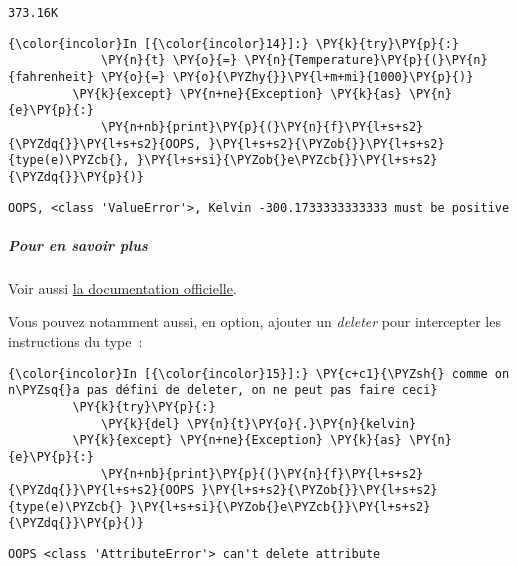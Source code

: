     \begin{Verbatim}[commandchars=\\\{\}]
373.16K

    \end{Verbatim}

    \begin{Verbatim}[commandchars=\\\{\}]
{\color{incolor}In [{\color{incolor}14}]:} \PY{k}{try}\PY{p}{:}
             \PY{n}{t} \PY{o}{=} \PY{n}{Temperature}\PY{p}{(}\PY{n}{fahrenheit} \PY{o}{=} \PY{o}{\PYZhy{}}\PY{l+m+mi}{1000}\PY{p}{)}
         \PY{k}{except} \PY{n+ne}{Exception} \PY{k}{as} \PY{n}{e}\PY{p}{:}
             \PY{n+nb}{print}\PY{p}{(}\PY{n}{f}\PY{l+s+s2}{\PYZdq{}}\PY{l+s+s2}{OOPS, }\PY{l+s+s2}{\PYZob{}}\PY{l+s+s2}{type(e)\PYZcb{}, }\PY{l+s+si}{\PYZob{}e\PYZcb{}}\PY{l+s+s2}{\PYZdq{}}\PY{p}{)}
\end{Verbatim}


    \begin{Verbatim}[commandchars=\\\{\}]
OOPS, <class 'ValueError'>, Kelvin -300.1733333333333 must be positive

    \end{Verbatim}

    \hypertarget{pour-en-savoir-plus}{%
\subparagraph{Pour en savoir plus}\label{pour-en-savoir-plus}}

    Voir aussi
\href{https://docs.python.org/3.6/library/functions.html\#property}{la
documentation officielle}.

    Vous pouvez notamment aussi, en option, ajouter un \emph{deleter} pour
intercepter les instructions du type~:

    \begin{Verbatim}[commandchars=\\\{\}]
{\color{incolor}In [{\color{incolor}15}]:} \PY{c+c1}{\PYZsh{} comme on n\PYZsq{}a pas défini de deleter, on ne peut pas faire ceci}
         \PY{k}{try}\PY{p}{:}
             \PY{k}{del} \PY{n}{t}\PY{o}{.}\PY{n}{kelvin}
         \PY{k}{except} \PY{n+ne}{Exception} \PY{k}{as} \PY{n}{e}\PY{p}{:}
             \PY{n+nb}{print}\PY{p}{(}\PY{n}{f}\PY{l+s+s2}{\PYZdq{}}\PY{l+s+s2}{OOPS }\PY{l+s+s2}{\PYZob{}}\PY{l+s+s2}{type(e)\PYZcb{} }\PY{l+s+si}{\PYZob{}e\PYZcb{}}\PY{l+s+s2}{\PYZdq{}}\PY{p}{)}
\end{Verbatim}


    \begin{Verbatim}[commandchars=\\\{\}]
OOPS <class 'AttributeError'> can't delete attribute

    \end{Verbatim}


    
    
    
